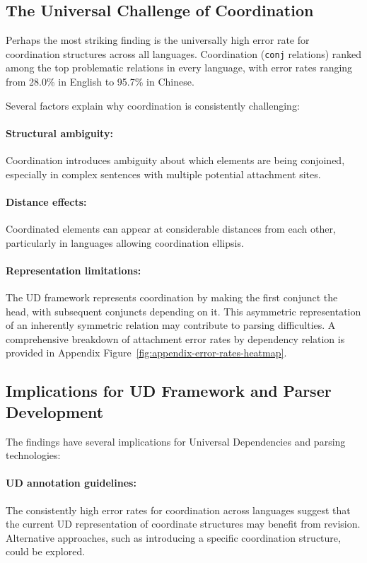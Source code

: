 \documentclass[11pt]{article}
\begin{document}
\subsection{The Universal Challenge of Coordination}

Perhaps the most striking finding is the universally high error rate for coordination structures across all languages. Coordination (\texttt{conj} relations) ranked among the top problematic relations in every language, with error rates ranging from 28.0\% in English to 95.7\% in Chinese.

Several factors explain why coordination is consistently challenging:

\paragraph{Structural ambiguity:} Coordination introduces ambiguity about which elements are being conjoined, especially in complex sentences with multiple potential attachment sites.

\paragraph{Distance effects:} Coordinated elements can appear at considerable distances from each other, particularly in languages allowing coordination ellipsis.

\paragraph{Representation limitations:} The UD framework represents coordination by making the first conjunct the head, with subsequent conjuncts depending on it. This asymmetric representation of an inherently symmetric relation may contribute to parsing difficulties.
A comprehensive breakdown of attachment error rates by dependency relation is provided in Appendix Figure~\ref{fig:appendix-error-rates-heatmap}.

\subsection{Implications for UD Framework and Parser Development}

The findings have several implications for Universal Dependencies and parsing technologies:

\paragraph{UD annotation guidelines:} The consistently high error rates for coordination across languages suggest that the current UD representation of coordinate structures may benefit from revision. Alternative approaches, such as introducing a specific coordination structure, could be explored.
\end{document}
